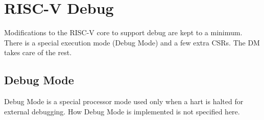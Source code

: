 \chapter{RISC-V Debug}
\label{sec:core_debug}

Modifications to the RISC-V core to support debug are kept to a minimum.  There
is a special execution mode (Debug Mode) and a few extra CSRs. The DM takes care
of the rest.

\section{Debug Mode} \label{debugmode}

Debug Mode is a special processor mode used only when a hart is halted for
external debugging. How Debug Mode is implemented is not specified here.

